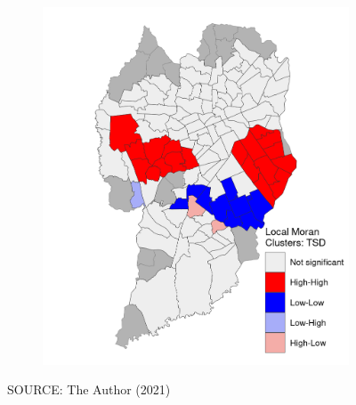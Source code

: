 \begin{figure}[!htbp]
\begin{subfigure}{0.5\textwidth}
        \includegraphics{fig/lisa_TSD.png}
    \end{subfigure}    
    \label{fig:gwr_tsd}
    \par SOURCE: The Author (2021)
\end{figure}


